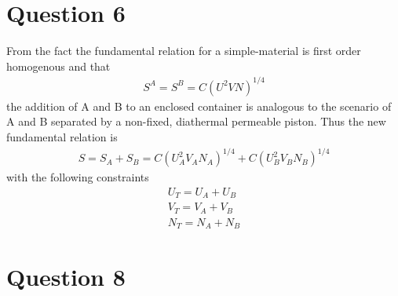 \documentclass{article}
\numberwithin{equation}{section}
\begin{document}
\large
\section*{Question 6}

From the fact the fundamental relation for a simple-material is first order homogenous and that 
\begin{align*}
S^A=S^B=C(U^2VN)^{1/4}
\end{align*} 
the addition of A and B to an enclosed container is analogous to the scenario of A and B separated by a non-fixed, diathermal permeable piston. Thus the new fundamental relation is
\begin{align*}
S=S_A+S_B=C(U_A^2V_AN_A)^{1/4}+C(U_B^2V_BN_B)^{1/4}
\end{align*}
with the following constraints
\begin{align*}
U_T=U_A+U_B\\
V_T=V_A+V_B\\
N_T=N_A+N_B
\end{align*}

\section*{Question 8}
\end{document}
